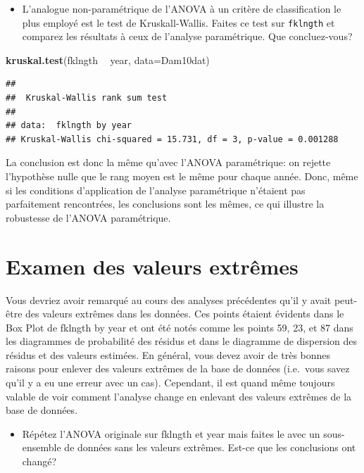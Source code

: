 \documentclass[12pt,]{book}
\newenvironment{Shaded}{\begin{snugshade}}{\end{snugshade}}
\newcommand{\DataTypeTok}[1]{\textcolor[rgb]{0.13,0.29,0.53}{#1}}
\newcommand{\KeywordTok}[1]{\textcolor[rgb]{0.13,0.29,0.53}{\textbf{#1}}}
\newcommand{\NormalTok}[1]{#1}
\newcommand{\OperatorTok}[1]{\textcolor[rgb]{0.81,0.36,0.00}{\textbf{#1}}}
\newcommand{\StringTok}[1]{\textcolor[rgb]{0.31,0.60,0.02}{#1}}
\providecommand{\tightlist}{%
  \setlength{\itemsep}{0pt}\setlength{\parskip}{0pt}}
\begin{document}
\begin{itemize}
\tightlist
\item
  L'analogue non-paramétrique de l'ANOVA à un critère de classification le plus employé est le test de Kruskall-Wallis. Faites ce test sur \texttt{fklngth} et comparez les résultats à ceux de l'analyse paramétrique. Que concluez-vous?
\end{itemize}

\begin{Shaded}
\begin{Highlighting}[]
\KeywordTok{kruskal.test}\NormalTok{(fklngth }\OperatorTok{~}\StringTok{ }\NormalTok{year, }\DataTypeTok{data=}\NormalTok{Dam10dat)}
\end{Highlighting}
\end{Shaded}

\begin{verbatim}
## 
##  Kruskal-Wallis rank sum test
## 
## data:  fklngth by year
## Kruskal-Wallis chi-squared = 15.731, df = 3, p-value = 0.001288
\end{verbatim}

La conclusion est donc la même qu'avec l'ANOVA paramétrique: on rejette l'hypothèse nulle que le rang moyen est le même pour chaque année. Donc, même si les conditions d'application de l'analyse paramétrique n'étaient pas parfaitement rencontrées, les conclusions sont les mêmes, ce qui illustre la robustesse de l'ANOVA paramétrique.

\hypertarget{examen-des-valeurs-extruxeames}{%
\section{Examen des valeurs extrêmes}\label{examen-des-valeurs-extruxeames}}

Vous devriez avoir remarqué au cours des analyses précédentes qu'il y avait peut-être des valeurs extrêmes dans les données. Ces points étaient évidents dans le Box Plot de fklngth by year et ont été notés comme les points 59, 23, et 87 dans les diagrammes de probabilité des résidus et dans le diagramme de dispersion des résidus et des valeurs estimées. En général, vous devez avoir de très bonnes raisons pour enlever des valeurs extrêmes de la base de données (i.e.~vous savez qu'il y a eu une erreur avec un cas). Cependant, il est quand même toujours valable de voir comment l'analyse change en enlevant des valeurs extrêmes de la base de données.

\begin{itemize}
\tightlist
\item
  Répétez l'ANOVA originale sur fklngth et year mais faites le avec un sous-ensemble de données sans les valeurs extrêmes. Est-ce que les conclusions ont changé?
\end{itemize}
\end{document}
